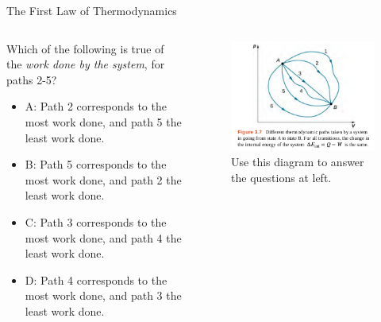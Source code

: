 \documentclass{beamer}
\begin{document}
\begin{frame}{The First Law of Thermodynamics}
\small
\begin{columns}[T]
\begin{column}{0.5\textwidth}
\small Which of the following is true of the \textit{work done by the system}, for paths 2-5?
\begin{itemize}
\item A: Path 2 corresponds to the most work done, and path 5 the least work done.
\item B: Path 5 corresponds to the most work done, and path 2 the least work done.
\item C: Path 3 corresponds to the most work done, and path 4 the least work done.
\item D: Path 4 corresponds to the most work done, and path 3 the least work done.
\end{itemize}
\end{column}
\begin{column}{0.5\textwidth}
\begin{figure}
\centering
\includegraphics[width=\textwidth]{figures/states1.png}
\caption{\label{fig:states2} Use this diagram to answer the questions at left.}
\end{figure}
\end{column}
\end{columns}
\end{frame}
\end{document}
